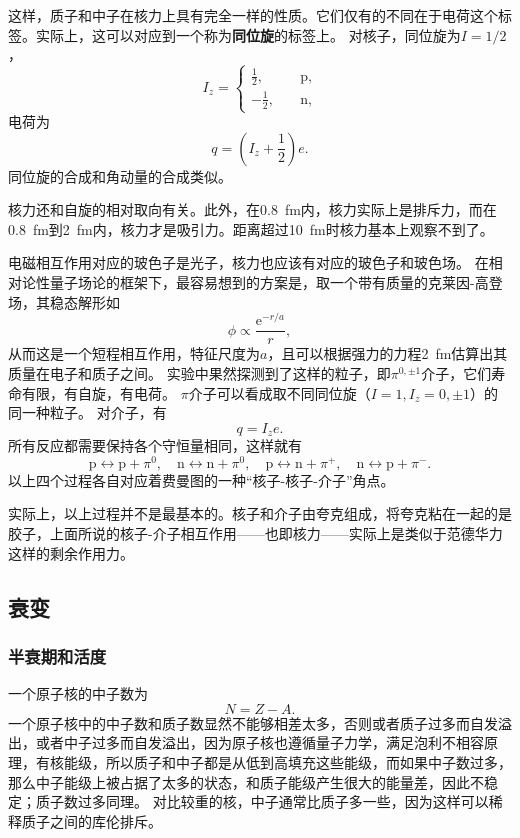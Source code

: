 \documentclass[UTF8, a4paper]{ctexart}
\newcommand*{\ee}{\mathrm{e}}
\begin{document}
这样，质子和中子在核力上具有完全一样的性质。它们仅有的不同在于电荷这个标签。实际上，这可以对应到一个称为\textbf{同位旋}的标签上。
对核子，同位旋为$I = 1/ 2$，
\begin{equation}
    I_z = \begin{cases}
        \frac{1}{2}, \quad &\text{p}, \\
        -\frac{1}{2}, \quad &\text{n},
    \end{cases}
\end{equation}
电荷为
\begin{equation}
    q = \left( I_z + \frac{1}{2} \right) e.
\end{equation}
同位旋的合成和角动量的合成类似。

核力还和自旋的相对取向有关。此外，在\SI{0.8}{fm}内，核力实际上是排斥力，而在\SI{0.8}{fm}到\SI{2}{fm}内，核力才是吸引力。距离超过\SI{10}{fm}时核力基本上观察不到了。

电磁相互作用对应的玻色子是光子，核力也应该有对应的玻色子和玻色场。
在相对论性量子场论的框架下，最容易想到的方案是，取一个带有质量的克莱因-高登场，其稳态解形如
\[
    \phi \propto \frac{\ee^{- r / a}}{r},
\]
从而这是一个短程相互作用，特征尺度为$a$，且可以根据强力的力程\SI{2}{fm}估算出其质量在电子和质子之间。
实验中果然探测到了这样的粒子，即$\pi^{0, \pm 1}$介子，它们寿命有限，有自旋，有电荷。
$\pi$介子可以看成取不同同位旋（$I=1,I_z=0, \pm 1$）的同一种粒子。
对介子，有
\begin{equation}
    q = I_z e.
\end{equation}
所有反应都需要保持各个守恒量相同，这样就有
\[
    \text{p} \longleftrightarrow \text{p} + \pi^0, \quad \text{n} \longleftrightarrow \text{n} + \pi^0, \quad \text{p} \longleftrightarrow \text{n} + \pi^+, \quad \text{n} \longleftrightarrow \text{p} + \pi^-. 
\]
以上四个过程各自对应着费曼图的一种“核子-核子-介子”角点。

实际上，以上过程并不是最基本的。核子和介子由夸克组成，将夸克粘在一起的是胶子，上面所说的核子-介子相互作用——也即核力——实际上是类似于范德华力这样的剩余作用力。

\subsection{衰变}

\subsubsection{半衰期和活度}

一个原子核的中子数为
\begin{equation}
    N = Z - A.
\end{equation}
一个原子核中的中子数和质子数显然不能够相差太多，否则或者质子过多而自发溢出，或者中子过多而自发溢出，因为原子核也遵循量子力学，满足泡利不相容原理，有核能级，所以质子和中子都是从低到高填充这些能级，而如果中子数过多，那么中子能级上被占据了太多的状态，和质子能级产生很大的能量差，因此不稳定；质子数过多同理。
对比较重的核，中子通常比质子多一些，因为这样可以稀释质子之间的库伦排斥。
\end{document}
